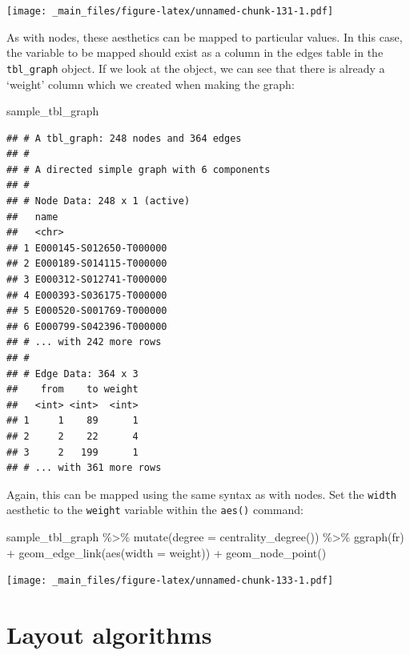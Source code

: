 \documentclass[
]{book}
\newenvironment{Shaded}{\begin{snugshade}}{\end{snugshade}}
\newcommand{\AttributeTok}[1]{\textcolor[rgb]{0.77,0.63,0.00}{#1}}
\newcommand{\FunctionTok}[1]{\textcolor[rgb]{0.00,0.00,0.00}{#1}}
\newcommand{\NormalTok}[1]{#1}
\newcommand{\SpecialCharTok}[1]{\textcolor[rgb]{0.00,0.00,0.00}{#1}}
\newcommand{\StringTok}[1]{\textcolor[rgb]{0.31,0.60,0.02}{#1}}
\begin{document}
\texttt{[image: \_main\_files/figure-latex/unnamed-chunk-131-1.pdf]}

As with nodes, these aesthetics can be mapped to particular values. In this case, the variable to be mapped should exist as a column in the edges table in the \texttt{tbl\_graph} object. If we look at the object, we can see that there is already a `weight' column which we created when making the graph:

\begin{Shaded}
\begin{Highlighting}[]
\NormalTok{sample\_tbl\_graph}
\end{Highlighting}
\end{Shaded}

\begin{verbatim}
## # A tbl_graph: 248 nodes and 364 edges
## #
## # A directed simple graph with 6 components
## #
## # Node Data: 248 x 1 (active)
##   name                   
##   <chr>                  
## 1 E000145-S012650-T000000
## 2 E000189-S014115-T000000
## 3 E000312-S012741-T000000
## 4 E000393-S036175-T000000
## 5 E000520-S001769-T000000
## 6 E000799-S042396-T000000
## # ... with 242 more rows
## #
## # Edge Data: 364 x 3
##    from    to weight
##   <int> <int>  <int>
## 1     1    89      1
## 2     2    22      4
## 3     2   199      1
## # ... with 361 more rows
\end{verbatim}

Again, this can be mapped using the same syntax as with nodes. Set the \texttt{width} aesthetic to the \texttt{weight} variable within the \texttt{aes()} command:

\begin{Shaded}
\begin{Highlighting}[]
\NormalTok{sample\_tbl\_graph }\SpecialCharTok{\%\textgreater{}\%} 
  \FunctionTok{mutate}\NormalTok{(}\AttributeTok{degree =} \FunctionTok{centrality\_degree}\NormalTok{()) }\SpecialCharTok{\%\textgreater{}\%} 
  \FunctionTok{ggraph}\NormalTok{(}\StringTok{\textquotesingle{}fr\textquotesingle{}}\NormalTok{) }\SpecialCharTok{+} 
  \FunctionTok{geom\_edge\_link}\NormalTok{(}\FunctionTok{aes}\NormalTok{(}\AttributeTok{width =}\NormalTok{ weight)) }\SpecialCharTok{+} 
  \FunctionTok{geom\_node\_point}\NormalTok{()}
\end{Highlighting}
\end{Shaded}

\texttt{[image: \_main\_files/figure-latex/unnamed-chunk-133-1.pdf]}

\hypertarget{layout-algorithms}{%
\section{Layout algorithms}\label{layout-algorithms}}
\end{document}
